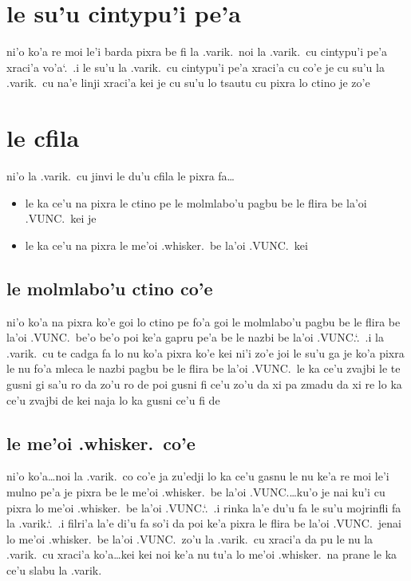 \documentclass{report}
\newcommand\sds{\spacefactor\sfcode`.\ \space}
\begin{document}
\section{le su'u cintypu'i pe'a}
ni'o ko'a re moi le'i barda pixra be fi la .varik.\ noi la .varik.\ cu cintypu'i pe'a xraci'a vo'a\sds  .i le su'u la .varik.\ cu cintypu'i pe'a xraci'a cu co'e je cu su'u la .varik.\ cu na'e linji xraci'a kei je cu su'u lo tsautu cu pixra lo ctino je zo'e

\section{le cfila}
ni'o la .varik.\ cu jinvi le du'u cfila le pixra fa\ldots

\begin{itemize}
	\item le ka ce'u na pixra le ctino pe le molmlabo'u pagbu be le flira be la'oi .VUNC.\ kei je
	\item le ka ce'u na pixra le me'oi .whisker.\ be la'oi .VUNC.\ kei
\end{itemize}

\subsection{le molmlabo'u ctino co'e}
ni'o ko'a na pixra ko'e goi lo ctino pe fo'a goi le molmlabo'u pagbu be le flira be la'oi .VUNC.\ be'o be'o poi ke'a gapru pe'a be le nazbi be la'oi .VUNC.\sds  .i la .varik.\ cu te cadga fa lo nu ko'a pixra ko'e kei ni'i zo'e joi le su'u ga je ko'a pixra le nu fo'a mleca le nazbi pagbu be le flira be la'oi .VUNC.\ le ka ce'u zvajbi le te gusni gi sa'u ro da zo'u ro de poi gusni fi ce'u zo'u da xi pa zmadu da xi re lo ka ce'u zvajbi de kei naja lo ka gusni ce'u fi de

\subsection{le me'oi .whisker.\ co'e}
ni'o ko'a\ldots noi la .varik.\ co co'e ja zu'edji lo ka ce'u gasnu le nu ke'a re moi le'i mulno pe'a je pixra be le me'oi .whisker.\ be la'oi .VUNC.\ldots ku'o je nai ku'i cu pixra lo me'oi .whisker.\ be la'oi .VUNC.\sds  .i rinka la'e du'u fa le su'u mojrinfli fa la .varik.\sds  .i filri'a la'e di'u fa so'i da poi ke'a pixra le flira be la'oi .VUNC.\ jenai lo me'oi .whisker.\ be la'oi .VUNC.\ zo'u la .varik.\ cu xraci'a da pu le nu la .varik.\ cu xraci'a ko'a\ldots kei kei noi ke'a nu tu'a lo me'oi .whisker.\ na prane le ka ce'u slabu la .varik.
\end{document}
